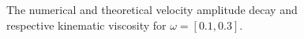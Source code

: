 \documentclass[a4paper,11pt, oneside]{book}
\begin{document}



\begin{figure}[ht]
\centering
\resizebox{0.8\columnwidth}{!}{\large}
\caption[Flow ]{The numerical and theoretical velocity amplitude decay and respective kinematic viscosity for $\omega=[0.1, 0.3] $.}
\label{fig:m4-1-streamplot}
\end{figure}






% 
\end{document}
